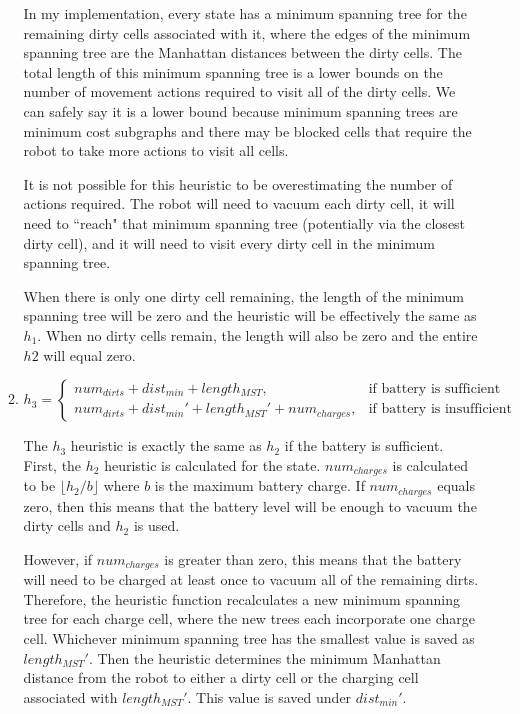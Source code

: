 \documentclass[letterpaper,11pt]{article}
\begin{document}
\begin{enumerate}
\begin{enumerate}
In my implementation, every state has a minimum spanning tree for the remaining dirty cells associated with it, where the edges of the minimum spanning tree are the Manhattan distances between the dirty cells.  The total length of this minimum spanning tree is a lower bounds on the number of movement actions required to visit all of the dirty cells.  We can safely say it is a lower bound because minimum spanning trees are minimum cost subgraphs and there may be blocked cells that require the robot to take more actions to visit all cells.

It is not possible for this heuristic to be overestimating the number of actions required.  The robot will need to vacuum each dirty cell, it will need to ``reach" that minimum spanning tree (potentially via the closest dirty cell), and it will need to visit every dirty cell in the minimum spanning tree.

When there is only one dirty cell remaining, the length of the minimum spanning tree will be zero and the heuristic will be effectively the same as $h_1$.  When no dirty cells remain, the length will also be zero and the entire $h2$ will equal zero.
\item 
$$
h_3 =
\begin{cases}
num_{dirts} + dist_{min} + length_{MST}, & \text{if battery is sufficient} \\
num_{dirts} + dist_{min}' + length_{MST}' + num_{charges}, & \text{if battery is insufficient}
\end{cases}
$$

The $h_3$ heuristic is exactly the same as $h_2$ if the battery is sufficient.  First, the $h_2$ heuristic is calculated for the state.  $num_{charges}$ is calculated to be $\lfloor h_2 / b \rfloor$ where $b$ is the maximum battery charge.  If $num_{charges}$ equals zero, then this means that the battery level will be enough to vacuum the dirty cells and $h_2$ is used.

However, if $num_{charges}$ is greater than zero, this means that the battery will need to be charged at least once to vacuum all of the remaining dirts.  Therefore, the heuristic function recalculates a new minimum spanning tree for each charge cell, where the new trees each incorporate one charge cell.  Whichever minimum spanning tree has the smallest value is saved as $length_{MST}'$.  Then the heuristic determines the minimum Manhattan distance from the robot to either a dirty cell or the charging cell associated with $length_{MST}'$.  This value is saved under $dist_{min}'$.


\end{enumerate}
\end{enumerate}
\end{document}
